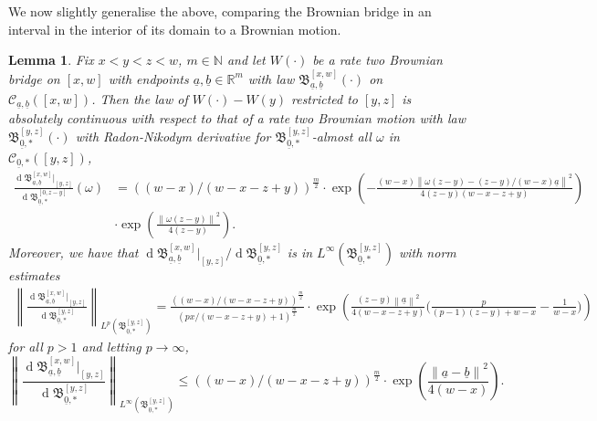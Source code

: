 \documentclass[11pt, reqno]{amsart}
\numberwithin{equation}{section}
\newcounter{dummy} \numberwithin{dummy}{section}
\newtheorem{lemma}[dummy]{Lemma}
\newcommand{\N}{\ensuremath{\mathbb{N}}}
\newcommand{\R}{\ensuremath{\mathbb{R}}}
\newcommand{\norm}[1]{\left\lVert#1\right\rVert}
\newcommand{\diff}{\ensuremath{\operatorname{d}\!}}
\begin{document}
We now slightly generalise the above, comparing the Brownian bridge in an interval in the interior of its domain to a Brownian motion. 
\begin{lemma}\label{lemma: brownian bridge comparison lemma general endpoints}
    Fix $x<y<z<w$, $m\in \N$ and let $W(\cdot)$ be a rate two Brownian bridge on $[x, w]$ with endpoints $\underline{a}, \underline{b}\in \R^m$ with law $\mathfrak{B}^{[x, w]}_{\underline{a}, \underline{b}}(\cdot)$ on $\mathscr{C}_{\underline{a}, \underline{b}}([x, w])$. Then the law of $W(\cdot)-W(y)$ restricted to $[y,z]$ is absolutely continuous with respect to that of a rate two Brownian motion with law $\mathfrak{B}^{[y, z]}_{\underline{0}, *}(\cdot)$ with Radon-Nikodym derivative for $\mathfrak{B}^{[y, z]}_{\underline{0}, *}$-almost all $\omega$ in $\mathscr{C}_{\underline{0},*}([y, z])$,
    \begin{equation*}
    \begin{array}{cc} 
        \frac{\diff\mathfrak{B}^{[x, w]}_{\underline{a}, \underline{b}}|_{[y,z]}}{\diff\mathfrak{B}^{[0, z-y]}_{\underline{0}, *}}(\omega) &= ((w-x)/(w-x-z+y))^{\frac{m}{2}}\cdot\exp\left(-\frac{(w-x)\norm{\omega(z-y)-(z-y)/(w-x)\underline{a}}^2}{4(z-y)(w-x-z+y)}\right)\\
        & \cdot \exp\left(\frac{\norm{\omega(z-y)}^2}{4(z-y)}\right).
        \end{array}
     \end{equation*}
        Moreover, we have that $\diff\mathfrak{B}^{[x, w]}_{\underline{a}, \underline{b}}|_{[y,z]}/\diff\mathfrak{B}^{[y, z]}_{\underline{0}, *}$ is in $L^\infty(\mathfrak{B}^{[y, z]}_{\underline{0}, *})$ with norm estimates
        \begin{equation*}
            \begin{array}{cc}
                 \norm{\frac{\diff\mathfrak{B}^{[x, w]}_{\underline{a}, \underline{b}}|_{[y,z]}}{\diff\mathfrak{B}^{[y, z]}_{\underline{0}, *}}}_{L^p\left(\mathfrak{B}^{[y, z]}_{\underline{0}, *}\right)} = \frac{((w-x)/(w-x-z+y))^{\frac{m}{2}}}{(px/(w-x-z+y)+1)^{\frac{m}{2}}}
                  \cdot \exp\left({\frac{(z-y)\norm{\underline{a}}^2}{4(w-x-z+y)}\big(\frac{p}{(p-1)(z-y)+w-x}-\frac{1}{w-x}\big)}\right)
            \end{array}
        \end{equation*}
        for all $p>1$ and letting $p\to \infty$,
    \begin{equation*}
        \norm{\frac{\diff\mathfrak{B}^{[x, w]}_{\underline{a}, \underline{b}}|_{[y,z]}}{\diff\mathfrak{B}^{[y, z]}_{\underline{0}, *}}}_{L^\infty\left(\mathfrak{B}^{[y, z]}_{\underline{0}, *}\right)} \le ((w-x)/(w-x-z+y))^{\frac{m}{2}}\cdot \exp\left({\frac{\norm{\underline{a}-\underline{b}}^2}{4(w-x)}}\right). 
    \end{equation*}
\end{lemma}
\end{document}
